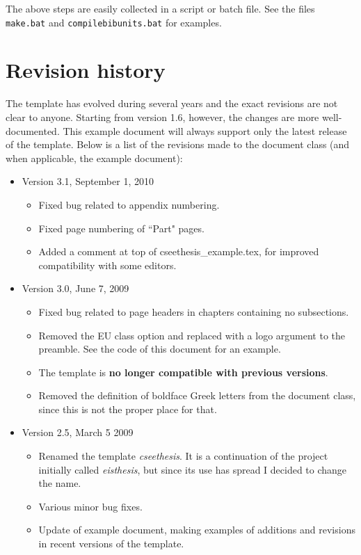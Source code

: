 The above steps are easily collected in a script or batch file. See
the files \texttt{make.bat} and \texttt{compilebibunits.bat} for
examples.

\section{Revision history}
The template has evolved during several years and the exact
revisions are not clear to anyone. Starting from version 1.6,
however, the changes are more well-documented. This example
document will always support only the latest release of the
template. Below is a list of the revisions made to the document
class (and when applicable, the example document):%
\begin{itemize}
	 \item Version 3.1, September 1, 2010
		\begin{itemize}
			\item Fixed bug related to appendix numbering.
			\item Fixed page numbering of ``Part" pages.
			\item Added a comment at top of cseethesis\_example.tex, for improved compatibility with some editors.
		\end{itemize}
	 \item Version 3.0, June 7, 2009
		\begin{itemize}
			\item Fixed bug related to page headers in chapters containing no subsections.
		   \item Removed the EU class option and replaced with a logo argument to the preamble. See the code of this document for an example.
			\item The template is \textbf{no longer compatible with previous versions}.
         \item Removed the definition of boldface Greek letters from the document class, since this is not the proper place for that.
		\end{itemize}
  	 \item Version 2.5, March 5 2009
		\begin{itemize}
         \item Renamed the template \textit{cseethesis}. It is a continuation of the project initially called \textit{eisthesis}, but since its use has spread I decided to change the name.
			\item Various minor bug fixes.
			\item Update of example document, making examples of additions and revisions in recent versions of the template.

\end{itemize}
\end{itemize}
